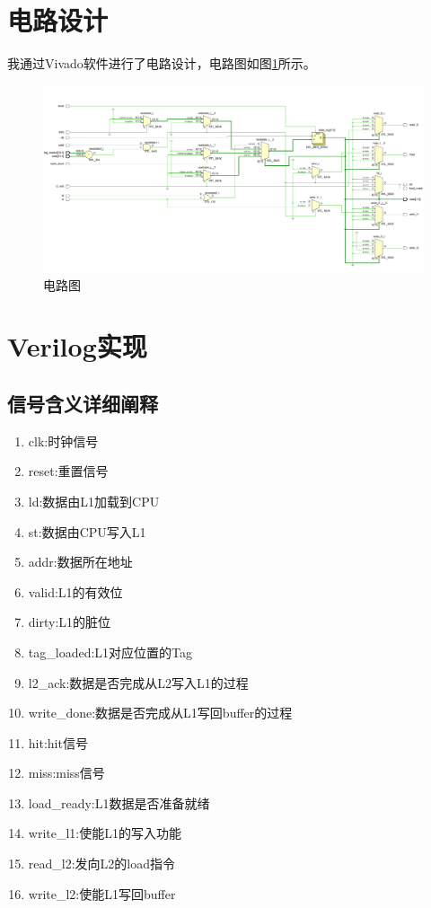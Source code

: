 \documentclass{../source/zjureport}
\begin{document}
    \section{电路设计}
        我通过Vivado软件进行了电路设计，电路图如图\ref{电路图}所示。
        \begin{figure}[H]
            \centering
            \includegraphics[width = \textwidth]{figure/电路图.png}
            \caption{电路图}
            \label{电路图}
        \end{figure}

    \section{Verilog实现}
        \subsection{信号含义详细阐释}
        \begin{enumerate}
            \item clk:时钟信号
            \item reset:重置信号
            \item ld:数据由L1加载到CPU
            \item st:数据由CPU写入L1
            \item addr:数据所在地址
            \item valid:L1的有效位
            \item dirty:L1的脏位
            \item tag_loaded:L1对应位置的Tag
            \item l2_ack:数据是否完成从L2写入L1的过程
            \item write_done:数据是否完成从L1写回buffer的过程
            \item hit:hit信号
            \item miss:miss信号
            \item load_ready:L1数据是否准备就绪
            \item write_l1:使能L1的写入功能
            \item read_l2:发向L2的load指令
            \item write_l2:使能L1写回buffer
        \end{enumerate}
\end{document}
